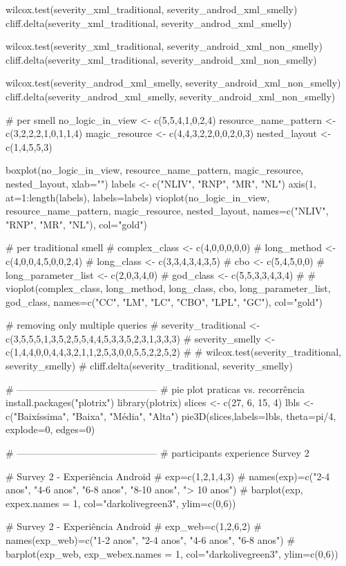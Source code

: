 wilcox.test(severity_xml_traditional, severity_androd_xml_smelly)
cliff.delta(severity_xml_traditional, severity_androd_xml_smelly)

wilcox.test(severity_xml_traditional, severity_android_xml_non_smelly)
cliff.delta(severity_xml_traditional, severity_android_xml_non_smelly)

wilcox.test(severity_androd_xml_smelly, severity_android_xml_non_smelly)
cliff.delta(severity_androd_xml_smelly, severity_android_xml_non_smelly)


# per smell
no_logic_in_view <- c(5,5,4,1,0,2,4)
resource_name_pattern <- c(3,2,2,2,1,0,1,1,4)
magic_resource <- c(4,4,3,2,2,0,0,2,0,3)
nested_layout <- c(1,4,5,5,3)

boxplot(no_logic_in_view, resource_name_pattern, magic_resource, nested_layout, xlab="")
labels <- c("NLIV", "RNP", "MR", "NL")
axis(1, at=1:length(labels), labels=labels)
vioplot(no_logic_in_view, resource_name_pattern, magic_resource, nested_layout, names=c("NLIV", "RNP", "MR", "NL"), col="gold")



# per traditional smell
# complex_class <- c(4,0,0,0,0,0)
# long_method <- c(4,0,0,4,5,0,0,2,4)
# long_class <- c(3,3,4,3,4,3,5)
# cbo <- c(5,4,5,0,0)
# long_parameter_list <- c(2,0,3,4,0)
# god_class <- c(5,5,3,3,4,3,4)
#
# vioplot(complex_class, long_method, long_class, cbo, long_parameter_list, god_class, names=c("CC", "LM", "LC", "CBO", "LPL", "GC"), col="gold")

# removing only multiple queries
# severity_traditional <- c(3,5,5,5,1,3,5,2,5,5,4,4,5,3,3,5,2,3,1,3,3,3)
# severity_smelly      <- c(1,4,4,0,0,4,4,3,2,1,1,2,5,3,0,0,5,5,2,2,5,2)
# 
# wilcox.test(severity_traditional, severity_smelly)
# cliff.delta(severity_traditional, severity_smelly)


# --------------------------------------------
# pie plot praticas vs. recorrência
install.packages("plotrix")
library(plotrix)
slices <- c(27, 6, 15, 4) 
lbls <- c("Baixíssima", "Baixa", "Média", "Alta")
pie3D(slices,labels=lbls, theta=pi/4, explode=0, edges=0)

# --------------------------------------------
# participants experience Survey 2

# Survey 2 - Experiência Android
# exp=c(1,2,1,4,3)
# names(exp)=c("2-4 anos", "4-6 anos", "6-8 anos", "8-10 anos", "> 10 anos")
# barplot(exp, expex.names = 1, col="darkolivegreen3", ylim=c(0,6))

# Survey 2 - Experiência Android
# exp_web=c(1,2,6,2)
# names(exp_web)=c("1-2 anos", "2-4 anos", "4-6 anos", "6-8 anos")
# barplot(exp_web, exp_webex.names = 1, col="darkolivegreen3", ylim=c(0,6))



